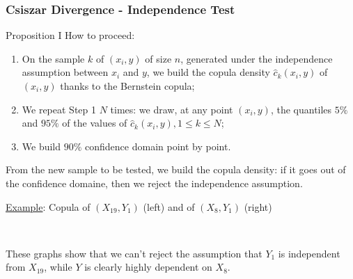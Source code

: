 \documentclass[8pt]{beamer}
\begin{document}
\begin{frame}
  \frametitle{Csiszar Divergence - Independence Test}
  \small
  
  \begin{block}{Proposition I}
   How to proceed: 
   \begin{enumerate}
    \item On the sample $k$ of $(x_i, y)$ of size $n$, generated under the independence assumption between $x_i$ and $y$, we build the copula density $\hat{c}_k(x_i,y)$  of $(x_i,y)$ thanks to the Bernstein copula;
    \item We repeat Step 1  $N$ times: we draw, at any point $(x_i,y)$, the quantiles $5\%$ and $95\%$ of the values of $\hat{c}_k(x_i,y), 1\leq k \leq N$;
    \item We build \alert{$90\%$ confidence domain} point by point.
   \end{enumerate}
From the new sample to be tested, we build the copula density: if it goes out of the confidence domaine, then we reject the independence assumption.
  \end{block}

 \underline{Example}: Copula of $(X_{19}, Y_1)$ (left) and of $(X_8, Y_1)$ (right)
\begin{center}
    \, 
  \end{center}
  These graphs show that we can't reject the assumption that $Y_1$ is independent from $X_{19}$, while $Y$ is clearly highly dependent on $X_8$.
  \end{frame}
  
\end{document}

